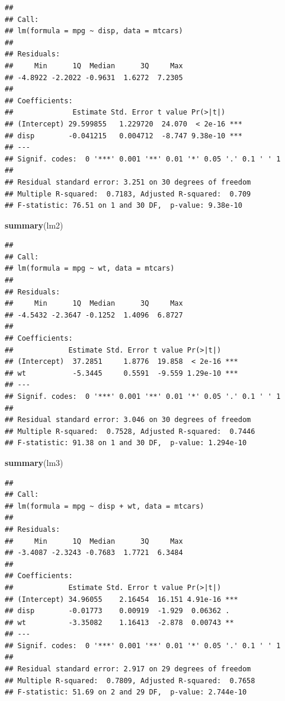 \documentclass[]{book}
\newenvironment{Shaded}{\begin{snugshade}}{\end{snugshade}}
\newcommand{\KeywordTok}[1]{\textcolor[rgb]{0.13,0.29,0.53}{\textbf{#1}}}
\newcommand{\NormalTok}[1]{#1}
\theoremstyle{definition}
\theoremstyle{definition}
\theoremstyle{definition}
\theoremstyle{remark}
\begin{document}
\begin{verbatim}
## 
## Call:
## lm(formula = mpg ~ disp, data = mtcars)
## 
## Residuals:
##     Min      1Q  Median      3Q     Max 
## -4.8922 -2.2022 -0.9631  1.6272  7.2305 
## 
## Coefficients:
##              Estimate Std. Error t value Pr(>|t|)    
## (Intercept) 29.599855   1.229720  24.070  < 2e-16 ***
## disp        -0.041215   0.004712  -8.747 9.38e-10 ***
## ---
## Signif. codes:  0 '***' 0.001 '**' 0.01 '*' 0.05 '.' 0.1 ' ' 1
## 
## Residual standard error: 3.251 on 30 degrees of freedom
## Multiple R-squared:  0.7183, Adjusted R-squared:  0.709 
## F-statistic: 76.51 on 1 and 30 DF,  p-value: 9.38e-10
\end{verbatim}

\begin{Shaded}
\begin{Highlighting}[]
\KeywordTok{summary}\NormalTok{(lm2)}
\end{Highlighting}
\end{Shaded}

\begin{verbatim}
## 
## Call:
## lm(formula = mpg ~ wt, data = mtcars)
## 
## Residuals:
##     Min      1Q  Median      3Q     Max 
## -4.5432 -2.3647 -0.1252  1.4096  6.8727 
## 
## Coefficients:
##             Estimate Std. Error t value Pr(>|t|)    
## (Intercept)  37.2851     1.8776  19.858  < 2e-16 ***
## wt           -5.3445     0.5591  -9.559 1.29e-10 ***
## ---
## Signif. codes:  0 '***' 0.001 '**' 0.01 '*' 0.05 '.' 0.1 ' ' 1
## 
## Residual standard error: 3.046 on 30 degrees of freedom
## Multiple R-squared:  0.7528, Adjusted R-squared:  0.7446 
## F-statistic: 91.38 on 1 and 30 DF,  p-value: 1.294e-10
\end{verbatim}

\begin{Shaded}
\begin{Highlighting}[]
\KeywordTok{summary}\NormalTok{(lm3)}
\end{Highlighting}
\end{Shaded}

\begin{verbatim}
## 
## Call:
## lm(formula = mpg ~ disp + wt, data = mtcars)
## 
## Residuals:
##     Min      1Q  Median      3Q     Max 
## -3.4087 -2.3243 -0.7683  1.7721  6.3484 
## 
## Coefficients:
##             Estimate Std. Error t value Pr(>|t|)    
## (Intercept) 34.96055    2.16454  16.151 4.91e-16 ***
## disp        -0.01773    0.00919  -1.929  0.06362 .  
## wt          -3.35082    1.16413  -2.878  0.00743 ** 
## ---
## Signif. codes:  0 '***' 0.001 '**' 0.01 '*' 0.05 '.' 0.1 ' ' 1
## 
## Residual standard error: 2.917 on 29 degrees of freedom
## Multiple R-squared:  0.7809, Adjusted R-squared:  0.7658 
## F-statistic: 51.69 on 2 and 29 DF,  p-value: 2.744e-10
\end{verbatim}
\end{document}
